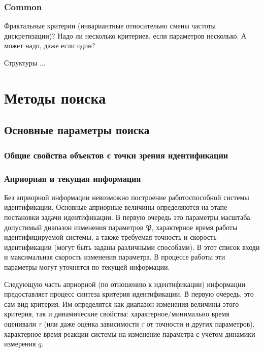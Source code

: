 \documentclass[a4paper,12pt]{article}
\begin{document}
\FloatBarrier
\subsubsection{Common}

Фрактальные критерии (инвариантные относительно смены частоты дискретизации)?
Надо ли несколько критериев, если параметров несколько.
А может надо, даже если один?

Структуры ...



\FloatBarrier
\section{Методы поиска}

\subsection{Основные параметры поиска}


\subsubsection{Общие свойства объектов с точки зрения идентификации}

\subsubsection{Априорная и текущая информация}

Без априорной информации невозможно построение
работоспособной системы идентификации. Основные
априорные величины определяются на этапе постановки
задачи идентификации. В первую очередь это
параметры масштаба: допустимый диапазон
изменения параметров \( \mathfrak{P}\),
характерное время работы
идентифицируемой системы, а также
требуемая точность и скорость идентификации
(могут быть заданы различными способами).
В этот список входи и максимальная скорость изменения параметра.
В процессе работы эти параметры могут уточнятся по текущей информации.

Следующую часть априорной (по отношению к идентификации) информации
предоставляет процесс синтеза критерия идентификации.
В первую очередь, это сам вид критерия. Им определятся
как диапазон изменения величины этого критерия, так и
динамические свойства: характерное/минимально время
оценивали \(\tau\) (или даже оценка зависимости $\tau$ от точности и других параметров),
характерное время реакции системы на изменение
параметра с учётом динамики измерения \(q\).
\end{document}
